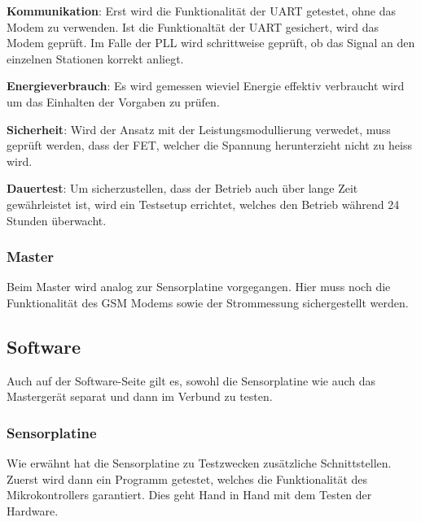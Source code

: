 \textbf{Kommunikation}: Erst wird die Funktionalit\"at der UART getestet, ohne
das Modem zu  verwenden. Ist die Funktionalt\"at der UART  gesichert, wird das
Modem gepr\"uft. Im Falle  der PLL wird schrittweise gepr\"uft,  ob das Signal
an den einzelnen Stationen korrekt anliegt.

\textbf{Energieverbrauch}: Es   wird   gemessen   wieviel   Energie   effektiv
verbraucht wird um das Einhalten der Vorgaben zu pr\"ufen.

\textbf{Sicherheit}: Wird der  Ansatz mit der  Leistungsmodullierung verwedet,
muss gepr\"uft werden, dass der  FET, welcher die Spannung herunterzieht nicht
zu heiss wird.

\textbf{Dauertest}: Um  sicherzustellen, dass  der Betrieb  auch \"uber  lange
Zeit gew\"ahrleistet  ist, wird ein  Testsetup errichtet, welches  den Betrieb
w\"ahrend 24 Stunden \"uberwacht.


\subsubsection{Master}

Beim  Master wird  analog zur  Sensorplatine vorgegangen. Hier  muss noch  die
Funktionalit\"at des GSM Modems sowie der Strommessung sichergestellt werden.


\subsection{Software}

Auch auf  der Software-Seite gilt  es, sowohl  die Sensorplatine wie  auch das
Masterger\"at separat und dann im Verbund zu testen.



\subsubsection{Sensorplatine}

Wie   erw\"ahnt   hat   die   Sensorplatine   zu   Testzwecken   zus\"atzliche
Schnittstellen. Zuerst   wird  dann   ein  Programm   getestet,  welches   die
Funktionalit\"at des  Mikrokontrollers garantiert. Dies geht Hand  in Hand mit
dem Testen der Hardware.

